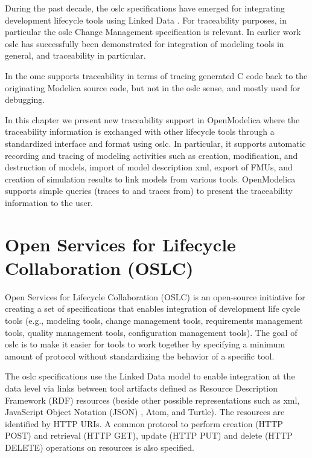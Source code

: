 During the past decade, the \acrshort{oslc} specifications \cite{oslc} have emerged for integrating development lifecycle tools using Linked Data \cite{linkeddatatom,linkeddata,linkeddatatim}. For traceability purposes, in particular the \acrshort{oslc} Change Management specification is relevant. In earlier work \cite{oslcelaasar} \acrshort{oslc} has successfully been demonstrated for integration of modeling tools in general, and traceability in particular. 

In \cite{debugingpop} the \acrshort{omc} supports traceability in terms of tracing generated C code back to the originating Modelica source code, but not in the \acrshort{oslc} sense, and mostly used for debugging. 

In this chapter we present new traceability support in OpenModelica where the traceability information is exchanged with other lifecycle 
tools through a standardized interface and format using \acrshort{oslc}. In particular, it supports automatic recording and tracing of
modeling activities such as creation, modification, and destruction of models, import of model description \acrshort{xml}, export of FMUs, and creation of simulation results to link models from various tools. OpenModelica supports simple queries (traces to and traces from) to present the traceability information to the user.


\section{Open Services for Lifecycle Collaboration (OSLC)}
\label{sec:tracaebilityoslc}

Open Services for Lifecycle Collaboration (OSLC) \cite{oslc} is an open-source initiative
for creating a set of specifications that enables integration of development life cycle tools (e.g.,
modeling tools, change management tools, requirements management tools, quality management
tools, configuration management tools). The goal of \acrshort{oslc} is to make it easier for tools to work together by
specifying a minimum amount of protocol without standardizing the behavior of a specific tool.

The \acrshort{oslc} specifications use the Linked Data model to enable integration at the data level via links between
tool artifacts defined as Resource Description Framework (RDF) \cite{rdffrank} resources (beside other possible representations such as
\acrshort{xml}, JavaScript Object Notation (JSON) \cite{json}, Atom, and Turtle). The resources are identified
by HTTP URIs. A common protocol to perform creation (HTTP POST) and retrieval (HTTP GET), update (HTTP PUT) and delete (HTTP DELETE) operations on resources is also specified.


